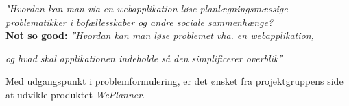\begin{center}

\textit{"Hvordan kan man via en webapplikation løse planlægningsmæssige}\\
\textit{problematikker i bofællesskaber og andre sociale sammenhænge?}
\vspace{5mm}\\\textbf{Not so good:}
\textit{''Hvordan kan man løse problemet vha. en webapplikation,}

\textit{og hvad skal applikationen indeholde så den simplificerer overblik''} \\
\end{center}

\noindent Med udgangspunkt i problemformulering, er det ønsket fra projektgruppens side at udvikle produktet \textit{WePlanner}.